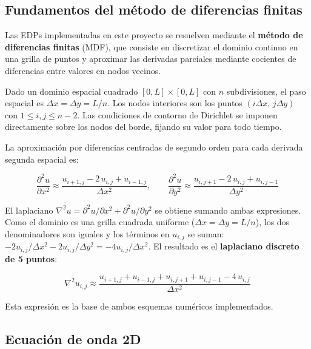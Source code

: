 \documentclass[12pt, a4paper]{article}
\begin{document}
\subsection{Fundamentos del método de diferencias finitas}

Las EDPs implementadas en este proyecto se resuelven mediante el \textbf{método de
diferencias finitas} (MDF), que consiste en discretizar el dominio continuo en una
grilla de puntos y aproximar las derivadas parciales mediante cocientes de diferencias
entre valores en nodos vecinos.

Dado un dominio espacial cuadrado $[0,L]\times[0,L]$ con $n$ subdivisiones, el paso
espacial es $\Delta x = \Delta y = L/n$. Los nodos interiores son los puntos
$(i\Delta x,\, j\Delta y)$ con $1 \leq i,j \leq n-2$. Las condiciones de contorno de
Dirichlet se imponen directamente sobre los nodos del borde, fijando su valor para
todo tiempo.

La aproximación por diferencias centradas de segundo orden para cada derivada segunda
espacial es:

\begin{equation}
    \frac{\partial^2 u}{\partial x^2} \approx
    \frac{u_{i+1,j} - 2\,u_{i,j} + u_{i-1,j}}{\Delta x^2}, \qquad
    \frac{\partial^2 u}{\partial y^2} \approx
    \frac{u_{i,j+1} - 2\,u_{i,j} + u_{i,j-1}}{\Delta y^2}
\end{equation}

El laplaciano $\nabla^2 u = \partial^2 u/\partial x^2 + \partial^2 u/\partial y^2$
se obtiene sumando ambas expresiones. Como el dominio es una grilla cuadrada uniforme
($\Delta x = \Delta y = L/n$), los dos denominadores son iguales y los términos en
$u_{i,j}$ se suman: $-2u_{i,j}/\Delta x^2 - 2u_{i,j}/\Delta y^2 = -4u_{i,j}/\Delta x^2$.
El resultado es el \textbf{laplaciano discreto de 5 puntos}:

\begin{equation}
    \nabla^2 u_{i,j} \approx
    \frac{u_{i+1,j} + u_{i-1,j} + u_{i,j+1} + u_{i,j-1} - 4\,u_{i,j}}{\Delta x^2}
    \label{eq:laplaciano}
\end{equation}

Esta expresión es la base de ambos esquemas numéricos implementados.

\subsection{Ecuación de onda 2D}
\end{document}
